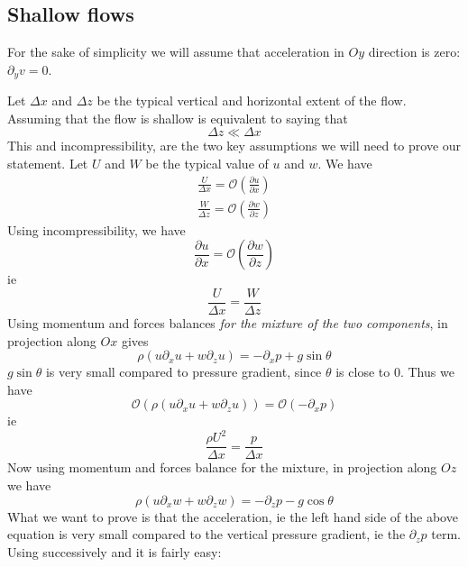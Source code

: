 \documentclass[11pt]{book}
\newcommand{\om}[1]{\ensuremath{ \mathcal{O} \left( {#1} \right) }}
\begin{document}
\subsection{Shallow flows}
For the sake of simplicity we will assume that acceleration in $Oy$ direction is zero: $ \partial_y v = 0 $.

Let $\Delta x$ and $\Delta z$ be the typical vertical and horizontal extent of the flow. Assuming that the flow is shallow is equivalent to saying that 
\begin{equation}
	\Delta z \ll \Delta x
\end{equation} 
This and incompressibility, are the two key assumptions we will need to prove our statement. 
Let $U$ and $W$ be the typical value of $u$ and $w$. We have
\begin{align}
	\frac{U}{\Delta x} = \om{ \frac{\partial u}{\partial x} } \\
	\frac{W}{\Delta z} = \om{ \frac{\partial w}{\partial z} }
\end{align}
Using incompressibility, we have
\begin{equation}
	\frac{\partial u}{\partial x} = \om{ \frac{\partial w}{\partial z} } 
\end{equation}
ie
\begin{equation} \label{eq:incomp}
	\frac{U}{\Delta x} = \frac{W}{\Delta z}
\end{equation}
Using momentum and forces balances \textit{for the mixture of the two components}, in projection along $Ox$ gives
\begin{equation}
	\rho \left( u \partial_x u + w \partial_z u \right) = -\partial_x p +g \sin \theta
\end{equation} 
$g \sin \theta$ is very small compared to pressure gradient, since $\theta$ is close to $0$. Thus we have
\begin{equation}
	\om{ \rho \left( u \partial_x u + w \partial_z u \right) } =  \om{ -\partial_x p }
\end{equation}
ie
\begin{equation} \label{eq:om_pressure}
	 \frac{\rho U^2}{\Delta x} = \frac{p}{\Delta x}
\end{equation}
Now using momentum and forces balance for the mixture, in projection along $Oz$ we have
\begin{equation} \label{eq:z_momentum}
	\rho \left( u \partial_x w + w \partial_z w \right) = -\partial_z p -g \cos \theta
\end{equation}
What we want to prove is that the acceleration, ie the left hand side of the above equation is very small compared to the vertical pressure gradient, ie the $\partial_z p$ term. Using successively \cite{eq:om_pressure} and \cite{eq:incomp} it is fairly easy:
\end{document}
